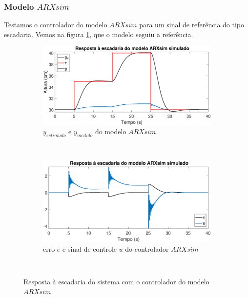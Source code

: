 \subsubsection{Modelo $ARXsim$}

Testamos o controlador do modelo $ARXsim$ para um sinal de referência do tipo escadaria. Vemos na figura \ref{fig:stairsarxsimy}, que o modelo seguiu a referência.

\begin{figure}[htb]
	\centering
	\begin{subfigure}[t]{0.48\textwidth}
		\includegraphics[width=1\linewidth]{pasta1_figuras/stairsarxsimy}
		\caption[$y_{estimado}$ e $y_{medido}$ do modelo $ARX2$]{$y_{estimado}$ e $y_{medido}$ do modelo $ARXsim$}
		\label{fig:stairsarxsimy}
	\end{subfigure}
	~ %
	\begin{subfigure}[t]{0.48\textwidth}
		\includegraphics[width=1\linewidth]{pasta1_figuras/stairsarxsime}
		\caption[erro $e$ e sinal de controle $u$ do controlador $ARX2$]{erro $e$ e sinal de controle $u$ do controlador $ARXsim$}
		\label{fig:stairsarxsime}
	\end{subfigure}
	~ %
	
	\caption{Resposta à escadaria do sistema com o controlador do modelo $ARXsim$}\label{fig:stairsarxsim}
\end{figure}

